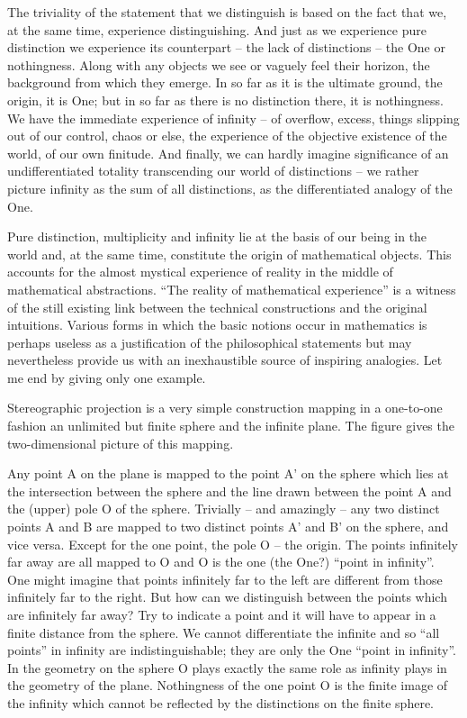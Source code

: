 The triviality of the statement that we distinguish is based on the fact that we, at the same time, experience distinguishing. And just as we experience pure distinction we experience its counterpart -- the lack of distinctions -- the One or nothingness. Along with any objects we see or vaguely feel their horizon, the background from which they emerge. In so far as it is the ultimate ground, the origin, it is One; but in so far as there is no distinction there, it is nothingness. We have the immediate experience of infinity -- of overflow, excess, things slipping out of our control, chaos or else, the experience of the objective existence of the world, of our own finitude. And finally, we can hardly imagine significance of an undifferentiated totality transcending our world of distinctions -- we rather picture infinity as the sum of all distinctions, as the differentiated analogy of the One. 

Pure distinction, multiplicity and infinity lie at the basis of our being in the world and, at the same time, constitute the origin of mathematical objects. This accounts for the almost mystical experience of reality in the middle of mathematical abstractions. ``The reality of mathematical experience'' is a witness of the still existing link between the technical constructions and the original intuitions. Various forms in which the basic notions occur in mathematics is perhaps useless as a justification of the philosophical statements but may nevertheless provide us with an inexhaustible source of inspiring analogies. Let me end by giving only one example. 

Stereographic projection is a very simple construction mapping in a one-to-one fashion an unlimited but finite sphere and the infinite plane. The figure gives the two-dimensional picture of this mapping.
\begin{center}

\end{center}
Any point A on the plane is mapped to the point A' on the sphere which lies at the intersection between the sphere and the line drawn between the point A and the (upper) pole O of the sphere. Trivially -- and amazingly -- any two distinct points A and B are mapped to two distinct points A' and B' on the sphere, and vice versa. Except for the one point, the pole O -- the origin. The points infinitely far away are all mapped to O and O is the one (the One?) ``point in infinity''. One might imagine that points infinitely far to the left are different from those infinitely far to the right. But how can we distinguish between the points which are infinitely far away? Try to indicate a point and it will have to appear in a finite distance from the sphere. We cannot differentiate the infinite and so ``all points'' in infinity are indistinguishable; they are only the One ``point in infinity''. In the geometry on the sphere O plays exactly the same role as infinity plays in the geometry of the plane. Nothingness of the one point O is the finite image of the infinity which cannot be reflected by the distinctions on the finite sphere.

